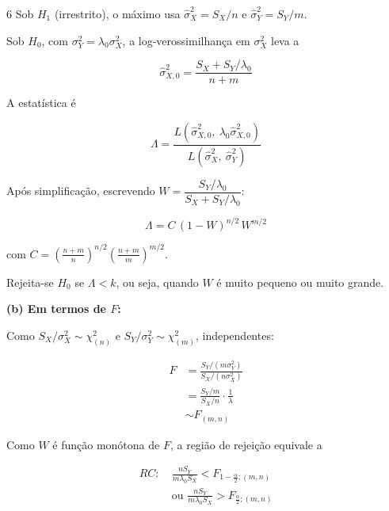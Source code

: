 \documentclass[8pt, a4paper, landscape]{extarticle}
\begin{document}
\begin{multicols}{6}
Sob $H_1$ (irrestrito), o máximo usa $\hat{\sigma}_X^2 = S_X/n$ e $\hat{\sigma}_Y^2 = S_Y/m$.

Sob $H_0$, com $\sigma_Y^2 = \lambda_0\sigma_X^2$, a log-verossimilhança em $\sigma_X^2$ leva a

\begin{equation*}
\hat{\sigma}_{X,0}^2 = \frac{S_X + S_Y/\lambda_0}{n+m}
\end{equation*}

A estatística é

\begin{equation*}
\Lambda = \frac{L(\hat{\sigma}_{X,0}^2,\ \lambda_0\hat{\sigma}_{X,0}^2)}{L(\hat{\sigma}_X^2,\ \hat{\sigma}_Y^2)}
\end{equation*}

Após simplificação, escrevendo $W = \dfrac{S_Y/\lambda_0}{S_X + S_Y/\lambda_0}$:

\begin{equation*}
\Lambda = C\,(1-W)^{n/2}\,W^{m/2}
\end{equation*}

com $C = \left(\frac{n+m}{n}\right)^{n/2}\left(\frac{n+m}{m}\right)^{m/2}$.

Rejeita-se $H_0$ se $\Lambda < k$, ou seja, quando $W$ é muito pequeno ou muito grande.

\vspace{0.2cm}

\textbf{(b) Em termos de $F$:}

Como $S_X/\sigma_X^2 \sim \chi^2_{(n)}$ e $S_Y/\sigma_Y^2 \sim \chi^2_{(m)}$, independentes:

\begin{equation*}
\begin{split}
F &= \frac{S_Y/(m\sigma_Y^2)}{S_X/(n\sigma_X^2)} \\
&= \frac{S_Y/m}{S_X/n}\cdot\frac{1}{\lambda} \\
&\sim F_{(m,n)}
\end{split}
\end{equation*}

Como $W$ é função monótona de $F$, a região de rejeição equivale a

\begin{equation*}
\begin{split}
RC: \ &\frac{nS_Y}{m\lambda_0 S_X} < F_{1-\frac{\alpha}{2};(m,n)} \\
&\text{ou } \frac{nS_Y}{m\lambda_0 S_X} > F_{\frac{\alpha}{2};(m,n)}
\end{split}
\end{equation*}


\end{multicols}
\end{document}
